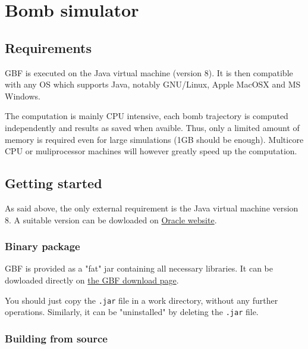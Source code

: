 \documentclass[10pt,a4paper]{article}
\begin{document}
  


\section{Bomb simulator}

\subsection{Requirements}
\label{sec-1}

GBF is executed on the Java virtual machine (version 8). It is then
compatible with any OS which supports Java, notably GNU/Linux, Apple
MacOSX and MS Windows.

The computation is mainly CPU intensive, each bomb trajectory is
computed independently and results as saved when avaible. Thus, only a
limited amount of memory is required even for large simulations (1GB
should be enough). Multicore CPU or muliprocessor machines will
however greatly speed up the computation.

\subsection{Getting started}
\label{sec-2}

As said above, the only external requirement is the Java virtual machine version 8.
A suitable version can be dowloaded on \href{http://www.oracle.com/technetwork/java/javase/downloads/index.html}{Oracle website}.

\subsubsection{Binary package}
\label{sec-2-1}

GBF is provided as a "fat" jar containing all necessary libraries. It can be dowloaded
directly on \href{http://example.com/download}{the GBF download page}.

You should just copy the \texttt{.jar} file in a work directory, without any
further operations. Similarly, it can be "uninstalled" by deleting the
\texttt{.jar} file.

\subsubsection{Building from source}
\label{sec-2-2}
\end{document}
